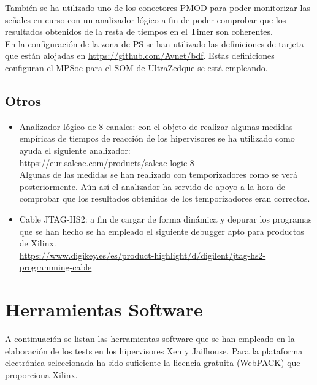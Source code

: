 También se ha utilizado uno de los conectores \acrshort{PMOD} para poder monitorizar las señales en curso con un analizador lógico a fin de poder comprobar que los resultados obtenidos de la resta de tiempos en el Timer son coherentes.\\

En la configuración de la zona de PS se han utilizado las definiciones de tarjeta que están alojadas en \url{https://github.com/Avnet/bdf}. Estas definiciones configuran el MPSoc para el \acrshort{SOM} de UltraZed\texttrademark que se está empleando.

\subsection{Otros}

\begin{itemize}
  \item Analizador lógico de 8 canales: con el objeto de realizar algunas medidas empíricas de tiempos de reacción de los hipervisores se ha utilizado como ayuda el siguiente analizador:\\
  \url{https://eur.saleae.com/products/saleae-logic-8}
  \\Algunas de las medidas se han realizado con temporizadores como se verá posteriormente. Aún así el analizador ha servido de apoyo a la hora de comprobar que los resultados obtenidos de los temporizadores eran correctos.
  \item Cable JTAG-HS2: a fin de cargar de forma dinámica y depurar los programas que se han hecho se ha empleado el siguiente debugger apto para productos de Xilinx.\\

  \url{https://www.digikey.es/es/product-highlight/d/digilent/jtag-hs2-programming-cable}
\end{itemize}

\section{Herramientas Software}

A continuación se listan las herramientas software que se han empleado en la elaboración de los tests en los hipervisores Xen y Jailhouse. Para la plataforma electrónica seleccionada ha sido suficiente la licencia gratuita (WebPACK) que proporciona Xilinx.

